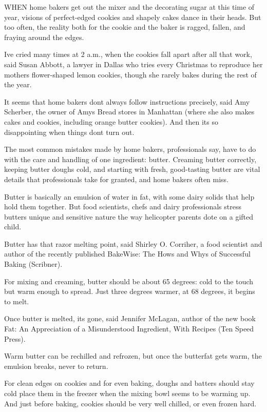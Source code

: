 \documentclass[12pt,landscape,twoside,twocolumn, openright, titlepage, draft]{book}
\begin{document}
WHEN home bakers get out the mixer and the decorating sugar at this time of year, visions of perfect-edged cookies and shapely cakes dance in their heads. But too often, the reality  both for the cookie and the baker  is ragged, fallen, and fraying around the edges.

Ive cried many times at 2 a.m., when the cookies fall apart after all that work, said Susan Abbott, a lawyer in Dallas who tries every Christmas to reproduce her mothers flower-shaped lemon cookies, though she rarely bakes during the rest of the year.

It seems that home bakers dont always follow instructions precisely, said Amy Scherber, the owner of Amys Bread stores in Manhattan (where she also makes cakes and cookies, including orange butter cookies). And then its so disappointing when things dont turn out.

The most common mistakes made by home bakers, professionals say, have to do with the care and handling of one ingredient: butter. Creaming butter correctly, keeping butter doughs cold, and starting with fresh, good-tasting butter are vital details that professionals take for granted, and home bakers often miss.

Butter is basically an emulsion of water in fat, with some dairy solids that help hold them together. But food scientists, chefs and dairy professionals stress butters unique and sensitive nature the way helicopter parents dote on a gifted child.

Butter has that razor melting point, said Shirley O. Corriher, a food scientist and author of the recently published BakeWise: The Hows and Whys of Successful Baking (Scribner).

For mixing and creaming, butter should be about 65 degrees: cold to the touch but warm enough to spread. Just three degrees warmer, at 68 degrees, it begins to melt.

Once butter is melted, its gone, said Jennifer McLagan, author of the new book Fat: An Appreciation of a Misunderstood Ingredient, With Recipes (Ten Speed Press).

Warm butter can be rechilled and refrozen, but once the butterfat gets warm, the emulsion breaks, never to return.

For clean edges on cookies and for even baking, doughs and batters should stay cold  place them in the freezer when the mixing bowl seems to be warming up. And just before baking, cookies should be very well chilled, or even frozen hard.
\end{document}
